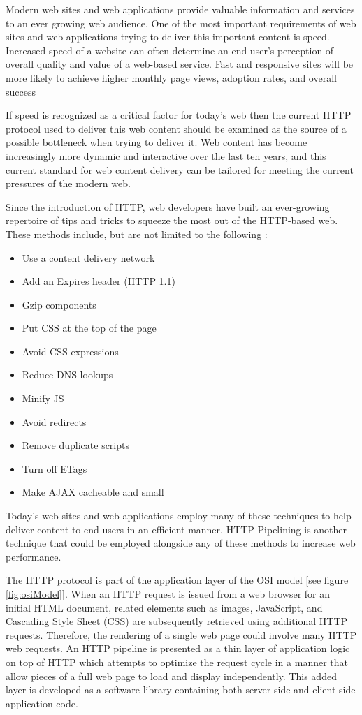 \documentclass[12pt]{report}
\begin{document}
Modern web sites and web applications provide valuable information and services to an ever growing web audience. One of the most important requirements of web sites and web applications trying to deliver this important content is speed. Increased speed of a website can often determine an end user's perception of overall quality and value of a web-based service. Fast and responsive sites will be more likely to achieve higher monthly page views, adoption rates, and overall success

If speed is recognized as a critical factor for today's web then the current HTTP protocol used to deliver this web content should be examined as the source of a possible bottleneck when trying to deliver it. Web content has become increasingly more dynamic and interactive over the last ten years, and this current standard for web content delivery can be tailored for meeting the current pressures of the modern web.

Since the introduction of HTTP, web developers have built an ever-growing repertoire of tips and tricks to squeeze the most out of the HTTP-based web. These methods include, but are not limited to the following \cite{highPerformanceWebsites}:

\begin{itemize}
	\item Use a content delivery network
	\item Add an Expires header (HTTP 1.1)
	\item Gzip components
	\item Put CSS at the top of the page
	\item Avoid CSS expressions
	\item Reduce DNS lookups
	\item Minify JS
	\item Avoid redirects
	\item Remove duplicate scripts
	\item Turn off ETags
	\item Make AJAX cacheable and small
\end{itemize}

Today's web sites and web applications employ many of these techniques to help deliver content to end-users in an efficient manner. HTTP Pipelining is another technique that could be employed alongside any of these methods to increase web performance.

The HTTP protocol is part of the application layer of the OSI model [see figure \ref{fig:osiModel}].  When an HTTP request is issued from a web browser for an initial HTML document, related elements such as images, JavaScript, and Cascading Style Sheet (CSS) are subsequently retrieved using additional HTTP requests. Therefore, the rendering of a single web page could involve many HTTP web requests. An HTTP pipeline is presented as a thin layer of application logic on top of HTTP which attempts to optimize the request cycle in a manner that allow pieces of a full web page to load and display independently.  This added layer is developed as a software library containing both server-side and client-side application code.
\end{document}
